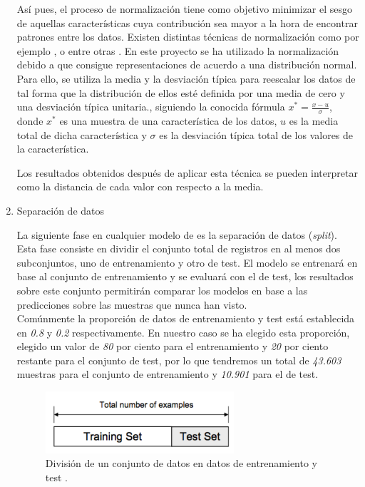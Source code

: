 \begin{enumerate}
                    Así pues, el proceso de normalización tiene como objetivo minimizar el sesgo de aquellas características cuya contribución sea mayor a la hora de encontrar patrones entre los datos. Existen distintas técnicas de normalización como por ejemplo ,  o  entre otras \cite{DataNormalizationInvestigation}. En este proyecto se ha utilizado la normalización  debido a que consigue representaciones de acuerdo a una distribución normal. Para ello, se utiliza la media y la desviación típica para reescalar los datos de tal forma que la distribución de ellos esté definida por una media de cero y una desviación típica unitaria., siguiendo la conocida fórmula  $x^* = \frac{x - u}{\sigma}$, donde $x^*$ es una muestra de una característica de los datos, $u$ es la media total de dicha característica y $\sigma$ es la desviación típica total de los valores de la característica.

                    Los resultados obtenidos después de aplicar esta técnica se pueden interpretar como la distancia de cada valor con respecto a la media.

                \item Separación de datos

                    La siguiente fase en cualquier modelo de  es la separación de datos (\textit{split}). Esta fase consiste en dividir el conjunto total de registros en al menos dos subconjuntos, uno de entrenamiento y otro de test. El modelo se entrenará en base al conjunto de entrenamiento y se evaluará con el de test, los resultados sobre este conjunto permitirán comparar los modelos en base a las predicciones sobre las muestras que nunca han visto.\\


                    Comúnmente la proporción de datos de entrenamiento y test está establecida en \textit{0.8} y \textit{0.2} respectivamente. En nuestro caso se ha elegido esta proporción, elegido un valor de \textit{80} por ciento para el entrenamiento y \textit{20} por ciento restante para el conjunto de test, por lo que tendremos un total de \textit{43.603} muestras para el conjunto de entrenamiento y \textit{10.901} para el de test.


                    \begin{figure}[h]
                        \centering
                        \includegraphics[width=7cm]{archivos/4.Metodologia/Datos/Separacion/DataSplit}
                        \caption{División de un conjunto de datos en datos de entrenamiento y test \cite{TrainTestSplitImage}.}
                        \label{DataSplitImage}
                     \end{figure}

            \end{enumerate}



